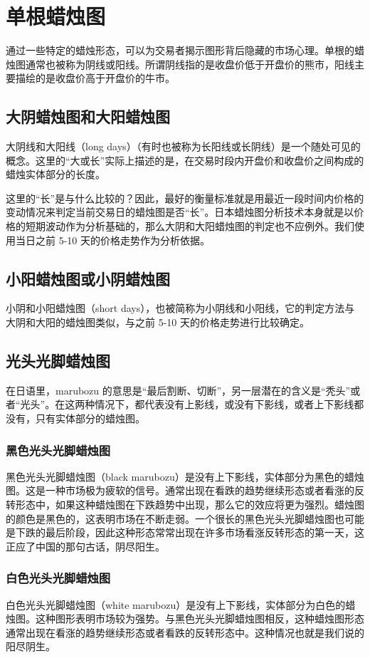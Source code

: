 \chapter{单根蜡烛图}
通过一些特定的蜡烛形态，可以为交易者揭示图形背后隐藏的市场心理。单根的蜡烛图通常也被称为阴线或阳线。所谓阴线指的是收盘价低于开盘价的熊市，阳线主要描绘的是收盘价高于开盘价的牛市。
\section{大阴蜡烛图和大阳蜡烛图}
大阴线和大阳线（long days）（有时也被称为长阳线或长阴线）是一个随处可见的概念。这里的“大或长”实际上描述的是，在交易时段内开盘价和收盘价之间构成的蜡烛实体部分的长度。

这里的“长”是与什么比较的？因此，最好的衡量标准就是用最近一段时间内价格的变动情况来判定当前交易日的蜡烛图是否“长”。日本蜡烛图分析技术本身就是以价格的短期波动作为分析基础的，那么大阴和大阳蜡烛图的判定也不应例外。我们使用当日之前 5-10 天的价格走势作为分析依据。

\section{小阳蜡烛图或小阴蜡烛图}
小阴和小阳蜡烛图（short days），也被简称为小阴线和小阳线，它的判定方法与大阴和大阳的蜡烛图类似，与之前 5-10 天的价格走势进行比较确定。
\section{光头光脚蜡烛图}
在日语里，marubozu 的意思是“最后割断、切断”，另一层潜在的含义是“秃头”或者“光头”。在这两种情况下，都代表没有上影线，或没有下影线，或者上下影线都没有，只有实体部分的蜡烛图。
\subsection*{黑色光头光脚蜡烛图}
黑色光头光脚蜡烛图（black marubozu）是没有上下影线，实体部分为黑色的蜡烛图。这是一种市场极为疲软的信号。通常出现在看跌的趋势继续形态或者看涨的反转形态中，如果这种蜡烛图在下跌趋势中出现，那么它的效应将更为强烈。蜡烛图的颜色是黑色的，这表明市场在不断走弱。一个很长的黑色光头光脚蜡烛图也可能是下跌的最后阶段，因此这种形态常常出现在许多市场看涨反转形态的第一天，这正应了中国的那句古话，阴尽阳生。
\subsection*{白色光头光脚蜡烛图}
白色光头光脚蜡烛图（white marubozu）是没有上下影线，实体部分为白色的蜡烛图。这种图形表明市场较为强势。与黑色光头光脚蜡烛图相反，这种蜡烛图形态通常出现在看涨的趋势继续形态或者看跌的反转形态中。这种情况也就是我们说的阳尽阴生。
